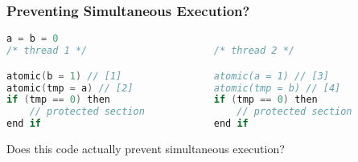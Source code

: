 \begin{frame}[fragile]
  \frametitle{Preventing Simultaneous Execution?}

  \begin{lstlisting}[language=C,morekeywords={foreach,pragma,omp,parallel,single,nowait,task,untied,barrier,taskyield,mergeable,final,taskwait,critical}]
                    a = b = 0
/* thread 1 */                      /* thread 2 */

atomic(b = 1) // [1]                atomic(a = 1) // [3]
atomic(tmp = a) // [2]              atomic(tmp = b) // [4]
if (tmp == 0) then                  if (tmp == 0) then
    // protected section                // protected section
end if                              end if
  \end{lstlisting}

  \begin{changemargin}{1cm}
\large
 Does this code actually prevent simultaneous execution?
  \end{changemargin}
  
\end{frame}

